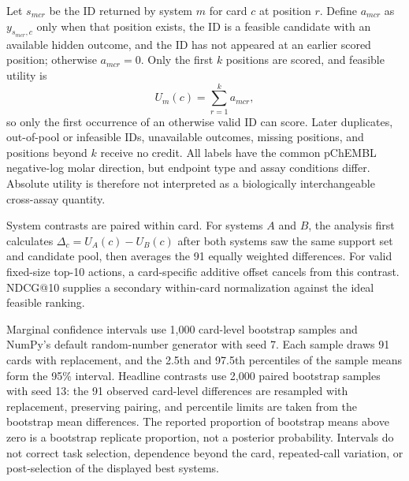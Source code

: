 \documentclass[10pt,a4paper]{article}
\begin{document}
Let $s_{mcr}$ be the ID returned by system $m$ for card $c$ at position $r$.
Define $a_{mcr}$ as $y_{s_{mcr},c}$ only when that position exists, the ID is a
feasible candidate with an available hidden outcome, and the ID has not appeared
at an earlier scored position; otherwise $a_{mcr}=0$. Only the first $k$
positions are scored, and feasible utility is
{\normalsize
\[
U_m(c)=\sum_{r=1}^{k}a_{mcr},
\]
}
so only the first occurrence of an otherwise valid ID can score. Later
duplicates, out-of-pool or infeasible IDs, unavailable outcomes, missing
positions, and positions beyond $k$ receive no credit. All labels have the
common pChEMBL negative-log molar direction, but endpoint type and assay
conditions differ. Absolute utility is therefore not interpreted as a
biologically interchangeable cross-assay quantity.

System contrasts are paired within card. For systems $A$ and $B$, the analysis
first calculates $\Delta_c=U_A(c)-U_B(c)$ after both systems saw the same
support set and candidate pool, then averages the 91 equally weighted
differences. For valid fixed-size top-10 actions, a card-specific additive
offset cancels from this contrast. NDCG@10 supplies a secondary within-card
normalization against the ideal feasible ranking.

Marginal confidence intervals use 1,000 card-level bootstrap samples and
NumPy's default random-number generator with seed 7. Each sample draws 91 cards
with replacement, and the 2.5th and 97.5th percentiles of the sample means form
the 95\% interval. Headline contrasts use 2,000 paired bootstrap samples with
seed 13: the 91 observed card-level differences are resampled with replacement,
preserving pairing, and percentile limits are taken from the bootstrap mean
differences. The reported proportion of bootstrap means above zero is a
bootstrap replicate proportion, not a posterior probability. Intervals do not
correct task selection, dependence beyond the card, repeated-call variation,
or post-selection of the displayed best systems.
\end{document}
